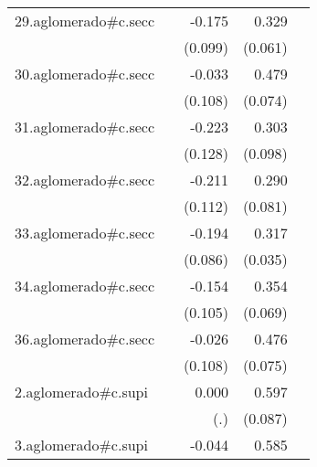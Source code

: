 {\begin{longtable}{l*{4}{D{.}{.}{-1}}}
\addlinespace
29.aglomerado#c.secc&                     &      -0.175         &       0.329\sym{***}&                     \\
            &                     &     (0.099)         &     (0.061)         &                     \\
\addlinespace
30.aglomerado#c.secc&                     &      -0.033         &       0.479\sym{***}&                     \\
            &                     &     (0.108)         &     (0.074)         &                     \\
\addlinespace
31.aglomerado#c.secc&                     &      -0.223         &       0.303\sym{**} &                     \\
            &                     &     (0.128)         &     (0.098)         &                     \\
\addlinespace
32.aglomerado#c.secc&                     &      -0.211         &       0.290\sym{***}&                     \\
            &                     &     (0.112)         &     (0.081)         &                     \\
\addlinespace
33.aglomerado#c.secc&                     &      -0.194\sym{*}  &       0.317\sym{***}&                     \\
            &                     &     (0.086)         &     (0.035)         &                     \\
\addlinespace
34.aglomerado#c.secc&                     &      -0.154         &       0.354\sym{***}&                     \\
            &                     &     (0.105)         &     (0.069)         &                     \\
\addlinespace
36.aglomerado#c.secc&                     &      -0.026         &       0.476\sym{***}&                     \\
            &                     &     (0.108)         &     (0.075)         &                     \\
\addlinespace
2.aglomerado#c.supi&                     &       0.000         &       0.597\sym{***}&                     \\
            &                     &         (.)         &     (0.087)         &                     \\
\addlinespace
3.aglomerado#c.supi&                     &      -0.044         &       0.585\sym{***}&                     \\

\end{longtable}}
